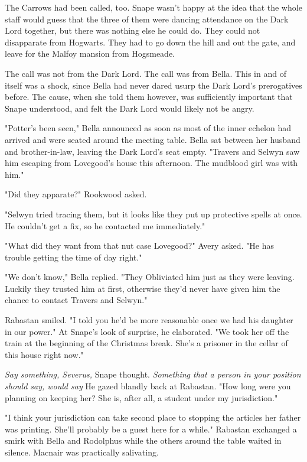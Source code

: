 The Carrows had been called, too. Snape wasn't happy at the idea that the whole staff would guess that the three of them were dancing attendance on the Dark Lord together, but there was nothing else he could do. They could not disapparate from Hogwarts. They had to go down the hill and out the gate, and leave for the Malfoy mansion from Hogsmeade.

The call was not from the Dark Lord. The call was from Bella. This in and of itself was a shock, since Bella had never dared usurp the Dark Lord's prerogatives before. The cause, when she told them however, was sufficiently important that Snape understood, and felt the Dark Lord would likely not be angry.

"Potter's been seen," Bella announced as soon as most of the inner echelon had arrived and were seated around the meeting table. Bella sat between her husband and brother-in-law, leaving the Dark Lord's seat empty. "Travers and Selwyn saw him escaping from Lovegood's house this afternoon. The mudblood girl was with him."

"Did they apparate?" Rookwood asked.

"Selwyn tried tracing them, but it looks like they put up protective spells at once. He couldn't get a fix, so he contacted me immediately."

"What did they want from that nut case Lovegood?" Avery asked. "He has trouble getting the time of day right."

"We don't know," Bella replied. "They Obliviated him just as they were leaving. Luckily they trusted him at first, otherwise they'd never have given him the chance to contact Travers and Selwyn."

Rabastan smiled. "I told you he'd be more reasonable once we had his daughter in our power." At Snape's look of surprise, he elaborated. "We took her off the train at the beginning of the Christmas break. She's a prisoner in the cellar of this house right now."

\emph{Say something, Severus,} Snape thought. \emph{Something that a person in your position should say, would say{\el}} He gazed blandly back at Rabastan. "How long were you planning on keeping her? She is, after all, a student under my jurisdiction."

"I think your jurisdiction can take second place to stopping the articles her father was printing. She'll probably be a guest here for a while." Rabastan exchanged a smirk with Bella and Rodolphus while the others around the table waited in silence. Macnair was practically salivating.

